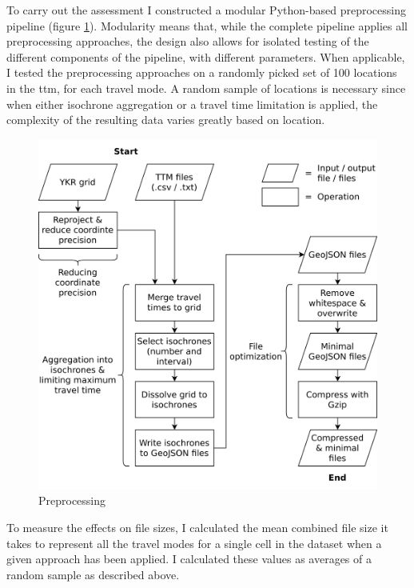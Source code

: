 To carry out the assessment
I constructed a modular Python-based preprocessing pipeline
(figure \ref{fig:preprocessing}).
Modularity means that,
while the complete pipeline applies all preprocessing approaches,
the design also allows for isolated testing of the
different components of the pipeline, with different parameters.
When applicable, I tested the preprocessing approaches on
a randomly picked set of 100 locations in the \acrshort{ttm},
for each travel mode.
A random sample of locations is necessary since when either
isochrone aggregation or a travel time limitation is applied,
the complexity of the resulting
data varies greatly based on location.

\begin{figure}[H]
	\centering
	\includegraphics[width=\diagramwidth]{visual/figures/diagrams/preprocessing.png}
	\caption{Preprocessing}
	\label{fig:preprocessing}
\end{figure}

To measure the effects on file sizes,
I calculated the mean combined file size it takes to represent
all the travel modes for a single cell in the dataset
when a given approach has been applied.
I calculated these values as averages of a random sample as described above.

